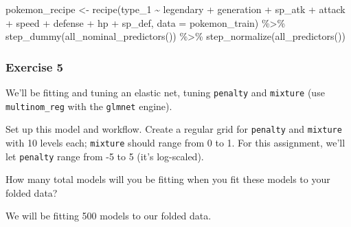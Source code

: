 \documentclass[
]{article}
\newenvironment{Shaded}{\begin{snugshade}}{\end{snugshade}}
\newcommand{\AttributeTok}[1]{\textcolor[rgb]{0.77,0.63,0.00}{#1}}
\newcommand{\FunctionTok}[1]{\textcolor[rgb]{0.00,0.00,0.00}{#1}}
\newcommand{\NormalTok}[1]{#1}
\newcommand{\OtherTok}[1]{\textcolor[rgb]{0.56,0.35,0.01}{#1}}
\newcommand{\SpecialCharTok}[1]{\textcolor[rgb]{0.00,0.00,0.00}{#1}}
\begin{document}
\begin{Shaded}
\begin{Highlighting}[]
\NormalTok{pokemon\_recipe }\OtherTok{\textless{}{-}} \FunctionTok{recipe}\NormalTok{(type\_1 }\SpecialCharTok{\textasciitilde{}}\NormalTok{ legendary }\SpecialCharTok{+}\NormalTok{ generation }\SpecialCharTok{+}\NormalTok{ sp\_atk }\SpecialCharTok{+}
\NormalTok{                           attack }\SpecialCharTok{+}\NormalTok{ speed }\SpecialCharTok{+}\NormalTok{ defense }\SpecialCharTok{+}\NormalTok{ hp }\SpecialCharTok{+}\NormalTok{ sp\_def,}
                         \AttributeTok{data =}\NormalTok{ pokemon\_train) }\SpecialCharTok{\%\textgreater{}\%}
  \FunctionTok{step\_dummy}\NormalTok{(}\FunctionTok{all\_nominal\_predictors}\NormalTok{()) }\SpecialCharTok{\%\textgreater{}\%} 
  \FunctionTok{step\_normalize}\NormalTok{(}\FunctionTok{all\_predictors}\NormalTok{()) }
\end{Highlighting}
\end{Shaded}

\hypertarget{exercise-5}{%
\subsubsection{Exercise 5}\label{exercise-5}}

We'll be fitting and tuning an elastic net, tuning \texttt{penalty} and
\texttt{mixture} (use \texttt{multinom\_reg} with the \texttt{glmnet}
engine).

Set up this model and workflow. Create a regular grid for
\texttt{penalty} and \texttt{mixture} with 10 levels each;
\texttt{mixture} should range from 0 to 1. For this assignment, we'll
let \texttt{penalty} range from -5 to 5 (it's log-scaled).

How many total models will you be fitting when you fit these models to
your folded data?

We will be fitting 500 models to our folded data.
\end{document}
